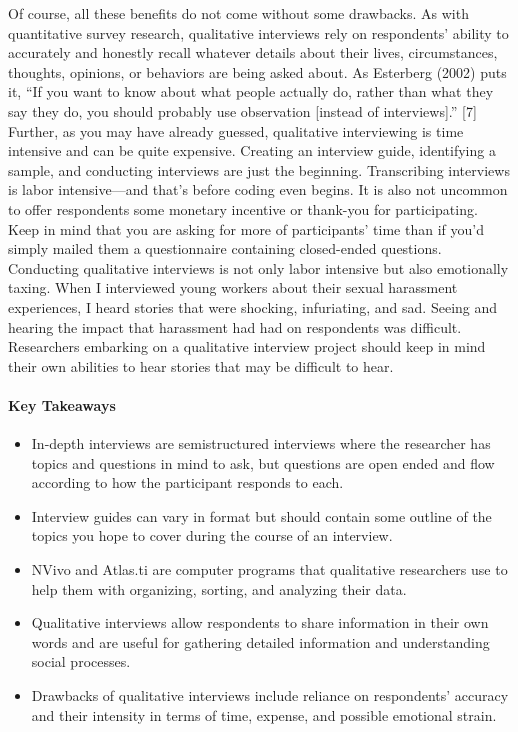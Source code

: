 Of course, all these benefits do not come without some drawbacks. As with quantitative survey research, qualitative interviews rely on respondents’ ability to accurately and honestly recall whatever details about their lives, circumstances, thoughts, opinions, or behaviors are being asked about. As Esterberg (2002) puts it, “If you want to know about what people actually do, rather than what they say they do, you should probably use observation [instead of interviews].” [7] Further, as you may have already guessed, qualitative interviewing is time intensive and can be quite expensive. Creating an interview guide, identifying a sample, and conducting interviews are just the beginning. Transcribing interviews is labor intensive—and that’s before coding even begins. It is also not uncommon to offer respondents some monetary incentive or thank-you for participating. Keep in mind that you are asking for more of participants’ time than if you’d simply mailed them a questionnaire containing closed-ended questions. Conducting qualitative interviews is not only labor intensive but also emotionally taxing. When I interviewed young workers about their sexual harassment experiences, I heard stories that were shocking, infuriating, and sad. Seeing and hearing the impact that harassment had had on respondents was difficult. Researchers embarking on a qualitative interview project should keep in mind their own abilities to hear stories that may be difficult to hear.
\paragraph{Key Takeaways}

\begin{itemize}
	\setlength{\itemsep}{0pt}
	\setlength{\parskip}{0pt}
	\setlength{\parsep}{0pt}
	
	\item In-depth interviews are semistructured interviews where the researcher has topics and questions in mind to ask, but questions are open ended and flow according to how the participant responds to each.
	\item Interview guides can vary in format but should contain some outline of the topics you hope to cover during the course of an interview.
	\item NVivo and Atlas.ti are computer programs that qualitative researchers use to help them with organizing, sorting, and analyzing their data.
	\item Qualitative interviews allow respondents to share information in their own words and are useful for gathering detailed information and understanding social processes.
	\item Drawbacks of qualitative interviews include reliance on respondents’ accuracy and their intensity in terms of time, expense, and possible emotional strain.
	
\end{itemize}

